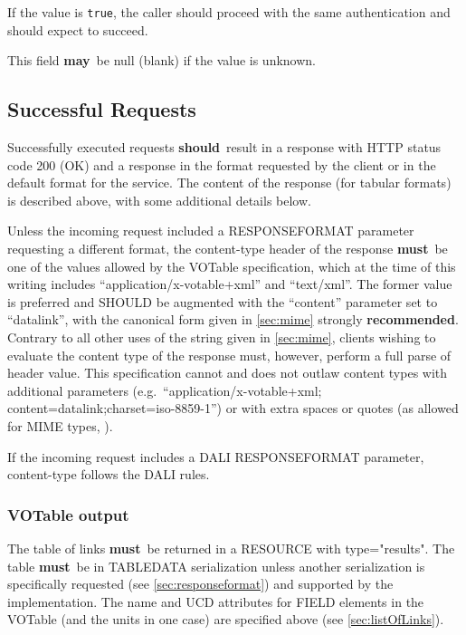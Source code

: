 \documentclass[11pt,a4paper]{ivoa}
\newcommand{\attval}[2]{#1={\allowbreak}{"}#2{"}}
\newcommand{\rfcmust}{\textbf{must}}
\newcommand{\rfcshould}{\textbf{should}}
\newcommand{\rfcmay}{\textbf{may}}
\newcommand{\rfcrecommended}{\textbf{recommended}}
\begin{document}
If the value is \verb|true|, the caller should proceed with the same authentication
and should expect to succeed.

This field \rfcmay\ be null (blank) if the value is unknown.

\subsection{Successful Requests}
\label{sec:successfulRequests}

Successfully executed requests \rfcshould\ result in a response with HTTP
status code 200 (OK) and a response in the format requested by the client
or in the default format for the service. The content of the response
(for tabular formats) is described above,
with some additional details below.

Unless the incoming request included a RESPONSEFORMAT parameter requesting
a different format, the content-type header of the response \rfcmust\ be one of the
values allowed by the VOTable specification, which at the time of this writing includes
``application/x-votable+xml'' and ``text/xml''. The former value is preferred
and SHOULD be augmented with the ``content'' parameter set to ``datalink'',
with the canonical form given in \ref{sec:mime}
strongly \rfcrecommended. Contrary to
all other uses of the string given in \ref{sec:mime},
clients wishing to evaluate
the content type of the response must, however, perform a full parse
of header value. This specification cannot and does not outlaw content
types with additional parameters
(e.g.\ ``application/x-votable+xml; content=datalink;charset=iso-8859-1'')
or with extra spaces or quotes
(as allowed for MIME types, \citet{std:RFC2045}).

If the incoming request includes a DALI RESPONSEFORMAT parameter,
content-type follows the DALI rules.


\subsubsection{VOTable output}
\label{sec:output}

The table of links \rfcmust\ be returned in a RESOURCE with
\attval{type}{results}. The table \rfcmust\ be in TABLEDATA serialization
unless another serialization is specifically requested
(see \ref{sec:responseformat})
and supported by the implementation.
The name and UCD attributes for FIELD elements in the VOTable
(and the units in one case) are specified above (see \ref{sec:listOfLinks}).
\end{document}
